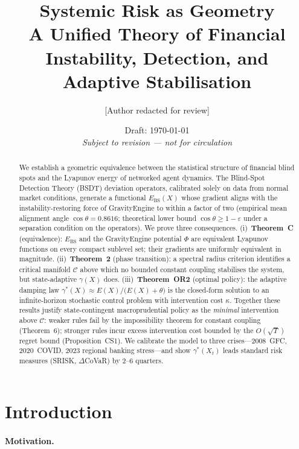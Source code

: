 \documentclass[11pt]{article}
\title{%
  \textbf{Systemic Risk as Geometry}\\[4pt]
  \large A Unified Theory of Financial Instability, Detection,
         and Adaptive Stabilisation
}
\author{%
  [Author redacted for review]
}
\date{Draft: \today \\ \small\textit{Subject to revision — not for circulation}}
\theoremstyle{definition}
\newcommand{\Ebs}{E_{\mathrm{BS}}}
\newcommand{\Cman}{\mathcal{C}}
\newcommand{\costheta}{\cos\theta}
\begin{document}
\maketitle

\begin{abstract}
We establish a geometric equivalence between the statistical structure of financial
blind spots and the Lyapunov energy of networked agent dynamics.  The Blind-Spot
Detection Theory (BSDT) deviation operators, calibrated solely on data from normal
market conditions, generate a functional $\Ebs(X)$ whose gradient aligns with the
instability-restoring force of GravityEngine to within a factor of two
(empirical mean alignment angle $\costheta = 0.8616$; theoretical lower bound
$\costheta \geq 1 - \varepsilon$ under a separation condition on the operators).
We prove three consequences.
(i)~\textbf{Theorem~C} (equivalence): $\Ebs$ and the GravityEngine potential $\Phi$
are equivalent Lyapunov functions on every compact sublevel set; their gradients
are uniformly equivalent in magnitude.
(ii)~\textbf{Theorem~2} (phase transition): a spectral radius criterion identifies a
critical manifold $\Cman$ above which no bounded constant coupling stabilises the
system, but state-adaptive $\gamma(X)$ does.
(iii)~\textbf{Theorem~OR2} (optimal policy): the adaptive damping law
$\gamma^*(X) \approx E(X)/\bigl(E(X)+\theta\bigr)$ is the closed-form solution to an
infinite-horizon stochastic control problem with intervention cost $\kappa$.
Together these results justify state-contingent macroprudential policy as the
\emph{minimal} intervention above $\Cman$: weaker rules fail by the impossibility
theorem for constant coupling (Theorem~6); stronger rules incur excess intervention
cost bounded by the $O(\sqrt{T})$ regret bound (Proposition~CS1).
We calibrate the model to three crises—2008~GFC, 2020~COVID, 2023 regional banking
stress—and show $\gamma^*(X_t)$ leads standard risk measures (SRISK, $\Delta$CoVaR)
by 2--6 quarters.
\end{abstract}

\tableofcontents
\newpage

\section{Introduction}
\label{sec:intro}

\paragraph{Motivation.}
\end{document}
